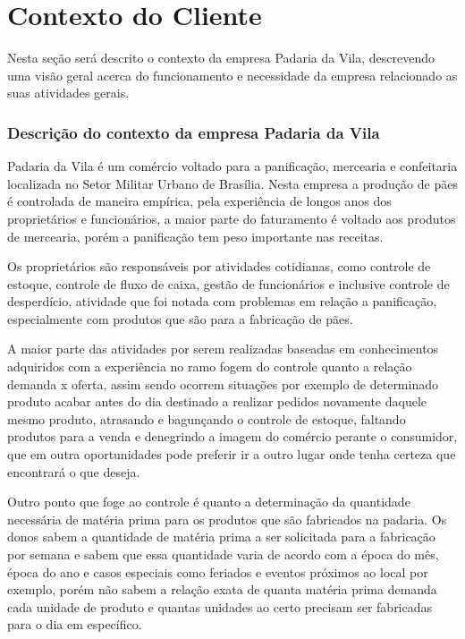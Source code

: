 \chapter{Contexto do Cliente}

Nesta seção será descrito o contexto da empresa Padaria da Vila, descrevendo uma visão geral acerca do funcionamento e necessidade da empresa relacionado as suas atividades gerais.

\subsection{Descrição do contexto da empresa Padaria da Vila}

Padaria da Vila é um comércio voltado para a panificação, mercearia e confeitaria localizada no Setor Militar Urbano de Brasília. Nesta empresa a produção de pães é controlada de maneira empírica, pela experiência de longos anos dos proprietários e funcionários, a maior parte do faturamento é voltado aos produtos de mercearia, porém a panificação tem peso importante nas receitas.

Os proprietários são responsáveis por atividades cotidianas, como controle de estoque, controle de fluxo de caixa, gestão de funcionários e inclusive controle de desperdício, atividade que foi notada com problemas em relação a panificação, especialmente com produtos que são  para a fabricação de pães.

A maior parte das atividades por serem realizadas baseadas em conhecimentos adquiridos com a experiência no ramo fogem do controle quanto a relação demanda x oferta, assim sendo ocorrem situações por exemplo de determinado produto acabar antes do dia destinado a realizar pedidos novamente daquele mesmo produto, atrasando e bagunçando o controle de estoque, faltando produtos para a venda e denegrindo a imagem do comércio perante o consumidor, que em outra oportunidades pode preferir ir a outro lugar onde tenha certeza que encontrará o que deseja.

Outro ponto que foge ao controle é quanto a determinação da quantidade necessária de matéria prima para os produtos que são fabricados na padaria. Os donos sabem a quantidade de matéria prima a ser solicitada para a fabricação por semana e sabem que essa quantidade varia de acordo com a época do mês, época do ano e casos especiais como feriados e eventos próximos ao local por exemplo, porém não sabem a relação exata de quanta matéria prima demanda cada unidade de produto e quantas unidades ao certo precisam ser fabricadas para o dia em específico.
